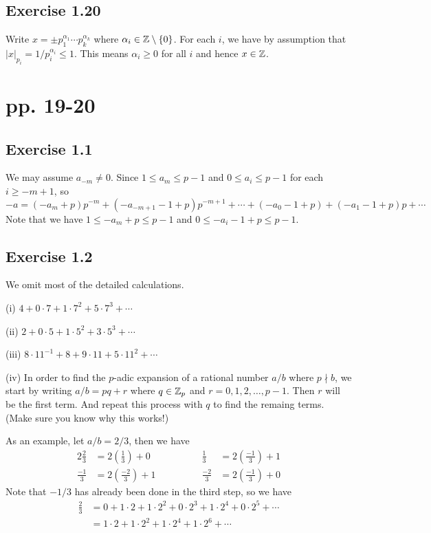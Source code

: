 \documentclass[../Koblitz.tex]{subfiles}
\begin{document}
\subsection*{Exercise 1.20}

Write $x=\pm p_1^{\alpha_1}\cdots p_k^{\alpha_k}$ where $\alpha_i\in\mathbb{Z}\setminus\{0\}$. For each $i$, we have by assumption that $|x|_{p_i} = 1/p_i^{\alpha_i} \leq 1$. This means $\alpha_i \geq 0$ for all $i$ and hence $x\in\mathbb{Z}$.

\section*{pp. 19-20}

\subsection*{Exercise 1.1}
We may assume $a_{-m}\neq0$. Since $1\leq a_m \leq p-1$ and $0\leq a_i \leq p-1$ for each $i\geq-m+1$, so
$$-a = (-a_m+p)p^{-m}+(-a_{-m+1}-1+p)p^{-m+1}+\cdots+(-a_0-1+p)+(-a_1-1+p)p+\cdots$$
Note that we have $1\leq -a_m+p\leq p-1$ and $0\leq -a_i-1+p\leq p-1$.

\subsection*{Exercise 1.2}

We omit most of the detailed calculations.

(i) $4+0\cdot7+1\cdot7^2+5\cdot7^3+\cdots$

(ii) $2+0\cdot5+1\cdot5^2+3\cdot5^3+\cdots$

(iii) $8\cdot11^{-1}+8+9\cdot11+5\cdot11^2+\cdots$

(iv) In order to find the $p$-adic expansion of a rational number $a/b$ where $p\nmid b$, we start by writing $a/b=pq+r$ where $q\in\mathbb{Z}_p$ and $r=0,1,2,\ldots,p-1$. Then $r$ will be the first term. And repeat this process with $q$ to find the remaing terms. (Make sure you know why this works!)

As an example, let $a/b=2/3$, then we have
\begin{alignat*}{2}
\frac{2}{3}&=2\left(\frac{1}{3}\right)+0 &\qquad\qquad \frac{1}{3}&=2\left(\frac{-1}{3}\right)+1 \\
\frac{-1}{3}&=2\left(\frac{-2}{3}\right)+1 &\qquad\qquad
\frac{-2}{3}&=2\left(\frac{-1}{3}\right)+0
\end{alignat*}
Note that $-1/3$ has already been done in the third step, so we have \begin{align*}
\frac{2}{3} &= 0+1\cdot2+1\cdot2^2+0\cdot2^3+1\cdot2^4+0\cdot2^5+\cdots \\
&= 1\cdot2+1\cdot2^2+1\cdot2^4+1\cdot2^6+\cdots
\end{align*}
\end{document}
